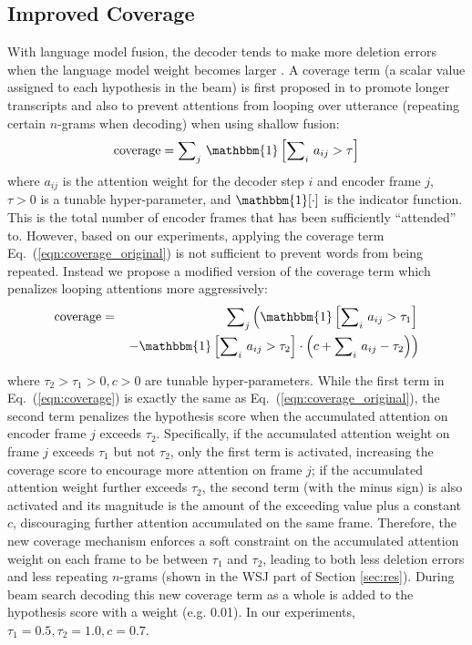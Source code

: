 \documentclass{article}
\begin{document}
\subsection{Improved Coverage}
With language model fusion, the decoder tends to make more deletion errors when the language model weight becomes larger \cite{bahdanau2016end}. A coverage term (a scalar value assigned to each hypothesis in the beam) is first proposed in \cite{chorowski2017towards} to promote longer transcripts and also to prevent attentions from looping over utterance (repeating certain $n$-grams when decoding) when using shallow fusion:
\begin{eqnarray}
\label{eqn:coverage_original}
\textrm{coverage} = {\displaystyle\sum}_j~ \mathbbm{1}\left[{\displaystyle\sum}_i~ a_{ij} > \tau\right]
\end{eqnarray}
where $a_{ij}$ is the attention weight for the decoder step $i$ and encoder frame $j$, $\tau>0$ is a tunable hyper-parameter, and $\mathbbm{1}[\cdot]$ is the indicator function. This is the total number of encoder frames that has been sufficiently ``attended'' to. However, based on our experiments, applying the coverage term Eq.~(\ref{eqn:coverage_original}) is not sufficient to prevent words from being repeated. Instead we propose a modified version of the coverage term which penalizes looping attentions more aggressively:
\begin{eqnarray}
\label{eqn:coverage}
\textrm{coverage} &=& {\displaystyle\sum}_j \left(\mathbbm{1}\left[{\displaystyle\sum}_i~ a_{ij} > \tau_1\right] \right.\nonumber \\
&&\left.-\mathbbm{1}\left[{\displaystyle\sum}_i~ a_{ij} > \tau_2\right] \cdot \left( c + {\displaystyle\sum}_i~ a_{ij} - \tau_2 \right) \right)
\end{eqnarray}

\noindent where $\tau_2>\tau_1>0,c>0$ are tunable hyper-parameters. While the first term in Eq.~(\ref{eqn:coverage}) is exactly the same as Eq.~(\ref{eqn:coverage_original}), the second term penalizes the hypothesis score when the accumulated attention on encoder frame $j$ exceeds $\tau_2$. Specifically, if the accumulated attention weight on frame $j$ exceeds $\tau_1$ but not $\tau_2$, only the first term is activated, increasing the coverage score to encourage more attention on frame $j$; if the accumulated attention weight further exceeds $\tau_2$, the second term (with the minus sign) is also activated and its magnitude is the amount of the exceeding value plus a constant $c$, discouraging further attention accumulated on the same frame. Therefore, the new coverage mechanism enforces a soft constraint on the accumulated attention weight on each frame to be between $\tau_1$ and $\tau_2$, leading to both less deletion errors and less repeating $n$-grams (shown in the WSJ part of Section \ref{sec:res}). During beam search decoding this new coverage term as a whole is added to the hypothesis score with a weight (e.g. 0.01). In our experiments, $\tau_1=0.5,\tau_2=1.0,c=0.7$.
\end{document}
